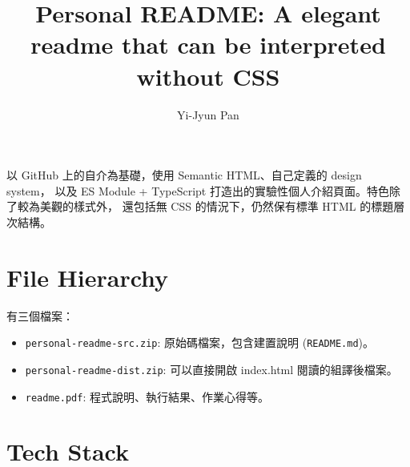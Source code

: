 \documentclass[12pt]{article}
\title{Personal README: A elegant readme that can be interpreted without CSS}
\author{Yi-Jyun Pan}
\date{}
\begin{document}
  \newcommand{\code}[1]{\texttt{#1}}

  \newcommand{\imgblock}[1]{\begin{figure}[H]
    \texttt{[image: \#1]}
    \centering
  \end{figure}}

  \maketitle

  以 GitHub 上的自介為基礎，使用 Semantic HTML、自己定義的 design system，
  以及 ES Module + TypeScript 打造出的實驗性個人介紹頁面。特色除了較為美觀的樣式外，
  還包括無 CSS 的情況下，仍然保有標準 HTML 的標題層次結構。

  \tableofcontents

  \newpage

  \section{File Hierarchy}

  有三個檔案：

  \begin{itemize}
    \item \code{personal-readme-src.zip}: 原始碼檔案，包含建置說明 (\code{README.md})。
    \item \code{personal-readme-dist.zip}: 可以直接開啟 index.html 閱讀的組譯後檔案。
    \item \code{readme.pdf}: 程式說明、執行結果、作業心得等。
  \end{itemize}

  \section{Tech Stack}
\end{document}
